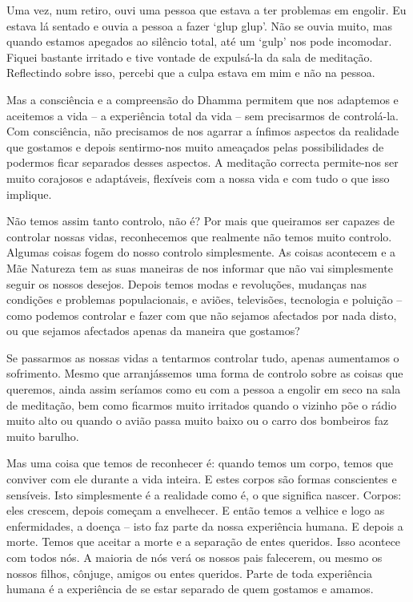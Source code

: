Uma vez, num retiro, ouvi uma pessoa que estava a ter problemas em engolir.
Eu estava lá sentado e ouvia a pessoa a fazer `glup glup'. Não se ouvia muito,
mas quando estamos apegados ao silêncio total, até um `gulp' nos pode incomodar.
Fiquei bastante irritado e tive vontade de expulsá-la da sala de meditação.
Reflectindo sobre isso, percebi que a culpa estava em mim e não na pessoa.

Mas a consciência e a compreensão do Dhamma permitem que nos adaptemos e
aceitemos a vida -- a experiência total da vida -- sem precisarmos de
controlá-la. Com consciência, não precisamos de nos agarrar a ínfimos aspectos
da realidade que gostamos e depois sentirmo-nos muito ameaçados pelas
possibilidades de podermos ficar separados desses aspectos. A meditação correcta
permite-nos ser muito corajosos e adaptáveis, flexíveis com a nossa vida e com
tudo o que isso implique.

Não temos assim tanto controlo, não é? Por mais que queiramos ser capazes de
controlar nossas vidas, reconhecemos que realmente não temos muito controlo.
Algumas coisas fogem do nosso controlo simplesmente. As coisas acontecem e a Mãe
Natureza tem as suas maneiras de nos informar que não vai simplesmente seguir os
nossos desejos. Depois temos modas e revoluções, mudanças nas condições e
problemas populacionais, e aviões, televisões, tecnologia e poluição -- como
podemos controlar e fazer com que não sejamos afectados por nada disto, ou que
sejamos afectados apenas da maneira que gostamos?

Se passarmos as nossas vidas a tentarmos controlar tudo, apenas aumentamos o
sofrimento. Mesmo que arranjássemos uma forma de controlo sobre as coisas que
queremos, ainda assim seríamos como eu com a pessoa a engolir em seco na sala de
meditação, bem como ficarmos muito irritados quando o vizinho põe o rádio muito
alto ou quando o avião passa muito baixo ou o carro dos bombeiros faz muito
barulho.

Mas uma coisa que temos de reconhecer é: quando temos um corpo, temos que
conviver com ele durante a vida inteira. E estes corpos são formas conscientes e
sensíveis. Isto simplesmente é a realidade como é, o que significa nascer.
Corpos: eles crescem, depois começam a envelhecer. E então temos a velhice e
logo as enfermidades, a doença -- isto faz parte da nossa experiência humana. E
depois a morte. Temos que aceitar a morte e a separação de entes queridos. Isso
acontece com todos nós. A maioria de nós verá os nossos pais falecerem, ou mesmo
os nossos filhos, cônjuge, amigos ou entes queridos. Parte de toda experiência
humana é a experiência de se estar separado de quem gostamos e amamos.

